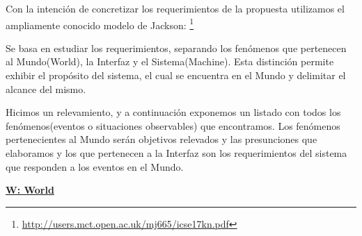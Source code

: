 Con la intención de concretizar los requerimientos de la propuesta utilizamos el ampliamente conocido modelo de Jackson: 
\footnote{\url{http://users.mct.open.ac.uk/mj665/icse17kn.pdf}}

Se basa en estudiar los requerimientos, separando los fenómenos que pertenecen al Mundo(World), la Interfaz y el Sistema(Machine). Esta distinción permite exhibir el propósito del sistema, el cual se encuentra en el Mundo y delimitar el alcance
del mismo. 

Hicimos un relevamiento, y a continuación exponemos un listado con todos los fenómenos(eventos o situaciones observables) que encontramos.
Los fenómenos pertenecientes al Mundo serán objetivos relevados y las presunciones que elaboramos y los que pertenecen a la Interfaz son los requerimientos del sistema que responden a los eventos en el Mundo.


\vspace{1cm}
\textbf{\underline{W: World}}

